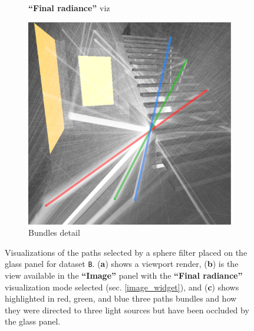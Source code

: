 \begin{figure}
\begin{subfigure}[t]{0.32\linewidth}
		\caption{\textbf{“Final radiance”} viz}
	\end{subfigure}
	\begin{subfigure}[t]{0.32\linewidth}
		\includegraphics[width=\textwidth]{chapters/chapter_results/b_paths1highlight}
		\caption{Bundles detail}
		\label{b_paths1highlight}
	\end{subfigure}

	\caption{Visualizations of the paths selected by a sphere filter placed on the glass panel for dataset \texttt{B}. (\textbf{a}) shows a viewport render, (\textbf{b}) is the view available in the \textbf{“Image”} panel with the \textbf{“Final radiance”} visualization mode selected (sec. \ref{image_widget}), and (\textbf{c}) shows highlighted in red, green, and blue three paths bundles and how they were directed to three light sources but have been occluded by the glass panel.}
	\label{couple2paths1}
\end{figure}

